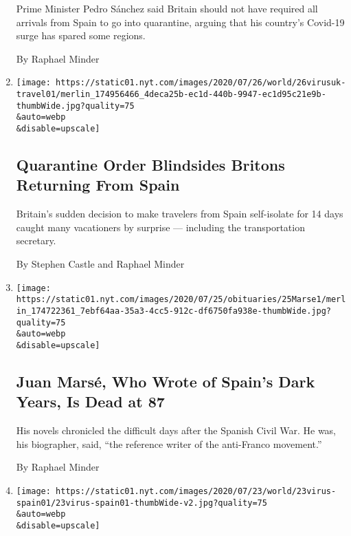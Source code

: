 \begin{enumerate}
  Prime Minister Pedro Sánchez said Britain should not have required all
  arrivals from Spain to go into quarantine, arguing that his country's
  Covid-19 surge has spared some regions.

  By Raphael Minder
\item
  \href{/2020/07/26/world/europe/Spain-quarantine-UK-travel.html}{}

  \texttt{[image: https://static01.nyt.com/images/2020/07/26/world/26virusuk-travel01/merlin\_174956466\_4deca25b-ec1d-440b-9947-ec1d95c21e9b-thumbWide.jpg?quality=75\\\&auto=webp\\\&disable=upscale]}

  \hypertarget{quarantine-order-blindsides-britons-returning-from-spain}{%
  \subsection{Quarantine Order Blindsides Britons Returning From
  Spain}\label{quarantine-order-blindsides-britons-returning-from-spain}}

  Britain's sudden decision to make travelers from Spain self-isolate
  for 14 days caught many vacationers by surprise --- including the
  transportation secretary.

  By Stephen Castle and Raphael Minder
\item
  \href{/2020/07/23/books/juan-marse-dead.html}{}

  \texttt{[image: https://static01.nyt.com/images/2020/07/25/obituaries/25Marse1/merlin\_174722361\_7ebf64aa-35a3-4cc5-912c-df6750fa938e-thumbWide.jpg?quality=75\\\&auto=webp\\\&disable=upscale]}

  \hypertarget{juan-marsuxe9-who-wrote-of-spains-dark-years-is-dead-at-87}{%
  \subsection{Juan Marsé, Who Wrote of Spain's Dark Years, Is Dead at
  87}\label{juan-marsuxe9-who-wrote-of-spains-dark-years-is-dead-at-87}}

  His novels chronicled the difficult days after the Spanish Civil War.
  He was, his biographer, said, ``the reference writer of the
  anti-Franco movement.''

  By Raphael Minder
\item
  \href{/2020/07/23/world/europe/spain-coronavirus-reopening.html}{}

  \texttt{[image: https://static01.nyt.com/images/2020/07/23/world/23virus-spain01/23virus-spain01-thumbWide-v2.jpg?quality=75\\\&auto=webp\\\&disable=upscale]}


\end{enumerate}
